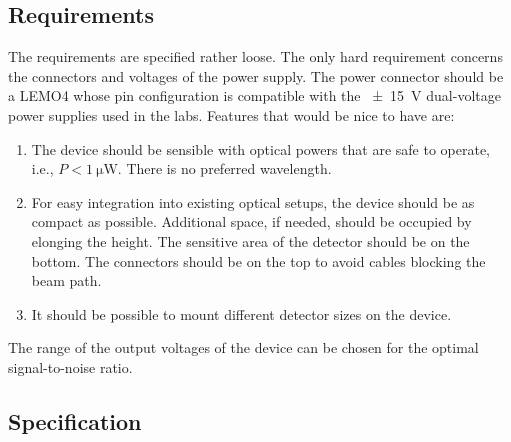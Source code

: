 \subsection{Requirements}

The requirements are specified rather loose. The only hard requirement concerns the connectors and voltages of the power supply. The power connector should be a LEMO4 whose pin configuration is compatible with the \SI{\pm15}{\volt} dual-voltage power supplies used in the labs. Features that would be nice to have are:
\begin{enumerate}
	\item The device should be sensible with optical powers that are safe to operate, i.e., $P<\SI{1}{\micro\watt}$. There is no preferred wavelength.
	\item For easy integration into existing optical setups, the device should be as compact as possible. Additional space, if needed, should be occupied by elonging the height. The sensitive area of the detector should be on the bottom. The connectors should be on the top to avoid cables blocking the beam path.
	\item It should be possible to mount different detector sizes on the device.
\end{enumerate}
The range of the output voltages of the device can be chosen for the optimal signal-to-noise ratio.

\subsection{Specification}


